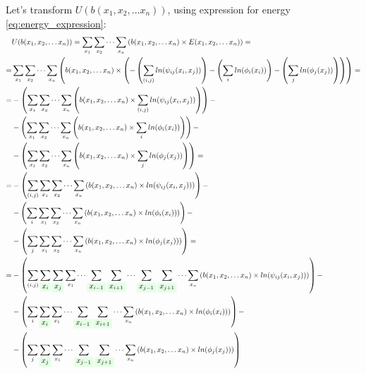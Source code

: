 \documentclass[fleqn,leqno]{article}
\newcommand{\highlight}[1]{\colorbox{green!10}{$\displaystyle#1$}}
\begin{document}
Let's transform $U(b(x_1,x_2,\dots x_n))$, using expression for energy \eqref{eq:energy_expression}:
\begin{equation}
\begin{split}
   & U(b(x_1,x_2,\dots x_n)) = \sum_{x_1} \sum_{x_2} \cdots \sum_{x_n} \left( b(x_1, x_2, \dots x_n) \times E(x_1, x_2, \dots x_n) \right) = \\
= & \sum_{x_1} \sum_{x_2} \cdots \sum_{x_n} \left( b(x_1, x_2, \dots x_n) \times \left( - \left( \sum_{(i, j)} ln(\psi_{ij}(x_i, x_j)) \right) - \left( \sum_{i} ln(\phi_i(x_i)) \right) - \left( \sum_{j} ln(\phi_j(x_j)) \right) \right) \right) = \\
= & -\left( \sum_{x_1} \sum_{x_2} \cdots \sum_{x_n} \left( b(x_1, x_2, \dots x_n) \times \sum_{(i, j)} ln(\psi_{ij}(x_i, x_j)) \right) \right) - \\ 
   & -\left( \sum_{x_1} \sum_{x_2} \cdots \sum_{x_n} \left( b(x_1, x_2, \dots x_n) \times \sum_{i} ln(\phi_{i}(x_i)) \right) \right) - \\ 
   & -\left( \sum_{x_1} \sum_{x_2} \cdots \sum_{x_n} \left( b(x_1, x_2, \dots x_n) \times \sum_{j} ln(\phi_{j}(x_j)) \right) \right) = \\
= & -\left( \sum_{(i, j)} \sum_{x_1} \sum_{x_2} \cdots \sum_{x_n} \left( b(x_1, x_2, \dots x_n) \times ln(\psi_{ij}(x_i, x_j)) \right) \right) - \\
   & -\left( \sum_{i} \sum_{x_1} \sum_{x_2} \cdots \sum_{x_n} \left( b(x_1, x_2, \dots x_n) \times ln(\phi_{i}(x_i)) \right) \right) - \\
   & -\left( \sum_{j} \sum_{x_1} \sum_{x_2} \cdots \sum_{x_n} \left( b(x_1, x_2, \dots x_n) \times ln(\phi_{j}(x_j)) \right) \right) = \\
= & -\left( \sum_{(i, j)} \sum_{\highlight{x_i}} \sum_{\highlight{x_j}} \sum_{x_1} \cdots \sum_{\highlight{x_{i-1}}} \sum_{\highlight{x_{i+1}}} \cdots \sum_{\highlight{x_{j-1}}} \sum_{\highlight{x_{j+1}}} \cdots \sum_{x_n} \left( b(x_1, x_2, \dots x_n) \times ln(\psi_{ij}(x_i, x_j)) \right) \right) - \\
   & -\left( \sum_{i} \sum_{\highlight{x_i}} \sum_{x_1} \cdots \sum_{\highlight{x_{i-1}}} \sum_{\highlight{x_{i+1}}} \cdots \sum_{x_n} \left( b(x_1, x_2, \dots x_n) \times ln(\phi_{i}(x_i)) \right) \right) - \\
   & -\left( \sum_{j} \sum_{\highlight{x_j}} \sum_{x_1} \cdots \sum_{\highlight{x_{j-1}}} \sum_{\highlight{x_{j+1}}} \cdots \sum_{x_n} \left( b(x_1, x_2, \dots x_n) \times ln(\phi_{j}(x_j)) \right) \right)
\end{split}
\end{equation}
\end{document}
